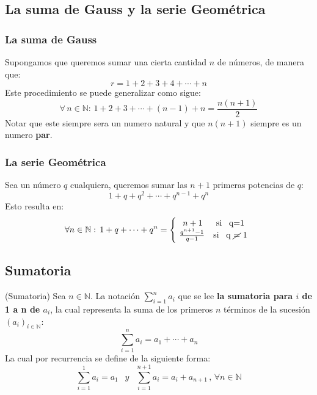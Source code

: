 \documentclass[10pt]{article}
\begin{document}
\begin{center}
 \subsection{La suma de Gauss y la serie Geométrica}
\end{center}

\subsubsection{La suma de Gauss}
Supongamos que queremos sumar una cierta cantidad $n$ de números, de manera que:
$$r = 1+2+3+4 + \cdots + n $$
Este procedimiento se puede generalizar como sigue:
$$\forall \, n\in \mathbb{N}: \, 1+2+3+ \cdots + (n-1) + n = \frac{n(n+1)}{2}$$
Notar que este siempre sera un numero natural y que $n(n+1)$ siempre es un numero \textbf{par}.
\subsubsection{La serie Geométrica}
Sea un número $q$ cualquiera, queremos sumar las $n + 1$ primeras potencias de $q$:
$$1+q+q^2+\cdots+q^{n-1}+q^n$$
Esto resulta en:
\begin{displaymath}
\forall n \in \mathbb{N}: \, 1+q+ \cdots + q^n = \left\{ \begin{array}{cc}
 n+1 & \mbox{si \, q=1}   \\
		\! \frac{q^{n+1} - 1}{q-1} & \mbox{si \, q \cancel{=} 1}  \\
 \end{array}\right.
\end{displaymath}

\begin{center}
 \subsection{Sumatoria }
\end{center}

\begin{defi}(Sumatoria)
	Sea $n \in \mathbb{N}$. La notación $ \displaystyle\sum^{n}_{i=1} a_i $ que se lee \textbf{la sumatoria para $i$ de 1 a n de $a_i$}, la cual representa la suma de los primeros $n$ términos de la sucesión $(a_i)_{i \in \mathbb{N}}$:
	$$ \displaystyle\sum^{n}_{i=1} a_i = a_1 + \cdots + a_n$$
	La cual por recurrencia se define de la siguiente forma:
	$$ \displaystyle\sum^{1}_{i=1} a_i = a_1 \,\ \,\ y \,\ \,\ \displaystyle\sum^{n+1}_{i=1} a_i = a_i + a_{n+1} \, , \, \forall n \in \mathbb{N}$$
\end{defi}
\end{document}
